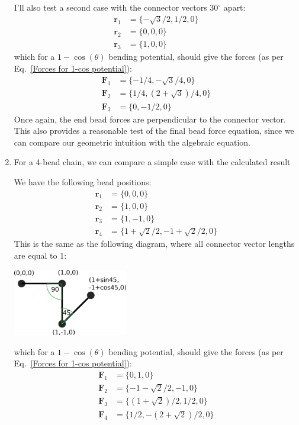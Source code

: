 \documentclass{article}
\begin{document}
\begin{enumerate}
I'll also test a second case with the connector vectors $30^{\circ}$ apart:
\begin{align*}
    \bm{r}_1 &= \{ -\sqrt{3}/2, 1/2, 0 \} \\
    \bm{r}_2 &= \{ 0, 0, 0 \} \\
    \bm{r}_3 &= \{ 1, 0, 0 \}
\end{align*}
which for a $1-\cos(\theta)$ bending potential, should give the forces (as per Eq.~\eqref{Forces for 1-cos potential}):
\begin{align*}
    \bm{F}_1 &= \{ -1/4, -\sqrt{3}/4, 0 \} \\
    \bm{F}_2 &= \{ 1/4, (2+\sqrt{3})/4, 0 \} \\
    \bm{F}_3 &= \{ 0, -1/2, 0 \}
\end{align*}
Once again, the end bead forces are perpendicular to the connector vector. 
This also provides a reasonable test of the final bead force equation, since we can compare our geometric intuition with the algebraic equation.

    \item For a 4-bead chain, we can compare a simple case with the calculated result
    
\noindent We have the following bead positions:
\begin{align*}
    \bm{r}_1 &= \{ 0, 0, 0 \} \\
    \bm{r}_2 &= \{ 1, 0, 0 \} \\
    \bm{r}_3 &= \{ 1, -1, 0 \} \\
    \bm{r}_4 &= \{ 1+\sqrt{2}/2, -1 + \sqrt{2}/2, 0 \}
\end{align*}
This is the same as the following diagram, where all connector vector lengths are equal to $1$:

\includegraphics[width=5cm,height=!]{4_beads_example.eps}

which for a $1-\cos(\theta)$ bending potential, should give the forces (as per Eq.~\eqref{Forces for 1-cos potential}):
\begin{align*}
    \bm{F}_1 &= \{ 0, 1, 0 \} \\
    \bm{F}_2 &= \{ -1-\sqrt{2}/2, -1, 0 \} \\
    \bm{F}_3 &= \{ (1+\sqrt{2})/2, 1/2, 0 \} \\
    \bm{F}_4 &= \{ 1/2, -(2+\sqrt{2})/2, 0 \}
\end{align*}


\end{enumerate}
\end{document}
